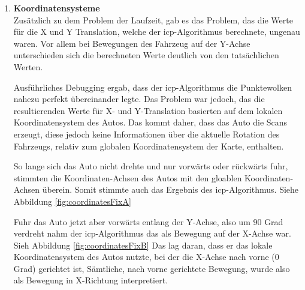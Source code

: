 \begin{enumerate}[leftmargin=*]
    \item \textbf{Koordinatensysteme} \\
    Zusätzlich zu dem Problem der Laufzeit, gab es das Problem, das die Werte für die X und Y Translation, welche der \ac{icp}-Algorithmus berechnete, ungenau waren.
    Vor allem bei Bewegungen des Fahrzeug auf der Y-Achse unterschieden sich die berechneten Werte deutlich von den tatsächlichen Werten.
    
    Ausführliches Debugging ergab, dass der \ac{icp}-Algorithmus die Punktewolken nahezu perfekt übereinander legte.
    Das Problem war jedoch, das die resultierenden Werte für X- und Y-Translation basierten auf dem lokalen Koordinatensystem des Autos.
    Das kommt daher, dass das Auto die Scans erzeugt, diese jedoch keine Informationen über die aktuelle Rotation des Fahrzeugs, 
    relativ zum globalen Koordinatensystem der Karte, enthalten.
    
    So lange sich das Auto nicht drehte und nur vorwärts oder rückwärts fuhr, stimmten die Koordinaten-Achsen des Autos mit den gloablen Koordinaten-Achsen überein. 
    Somit stimmte auch das Ergebnis des \ac{icp}-Algorithmus.
    Siehe Abbildung \ref{fig:coordinatesFixA}

    Fuhr das Auto jetzt aber vorwärts entlang der Y-Achse, also um 90 Grad verdreht
    nahm der \ac{icp}-Algorithmus das als Bewegung auf der X-Achse war. 
    Sieh Abbildung \ref{fig:coordinatesFixB}
    Das lag daran, dass er das lokale Koordinatensystem des Autos nutzte, bei der die X-Achse nach vorne (0 Grad) gerichtet ist,
    Sämtliche, nach vorne gerichtete Bewegung, wurde also als Bewegung in X-Richtung interpretiert.


\end{enumerate}

